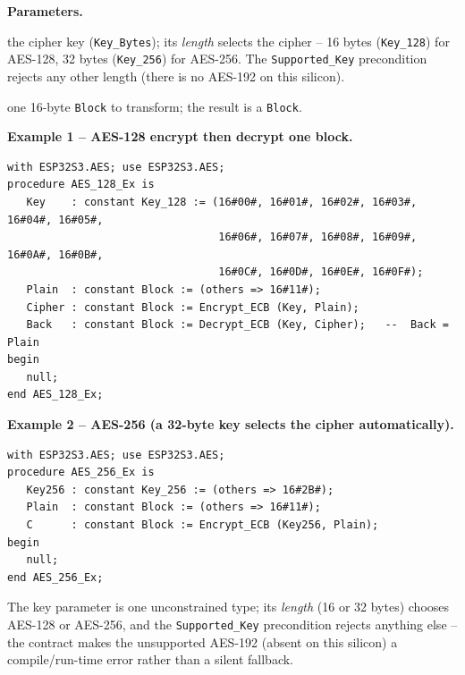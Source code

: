 \textbf{Parameters.}
\begin{description}[style=nextline]
\item[\texttt{Key}] the cipher key (\texttt{Key\_Bytes}); its \emph{length} selects
  the cipher -- 16 bytes (\texttt{Key\_128}) for AES-128, 32 bytes
  (\texttt{Key\_256}) for AES-256. The \texttt{Supported\_Key} precondition rejects
  any other length (there is no AES-192 on this silicon).
\item[\texttt{Plain} / \texttt{Cipher}] one 16-byte \texttt{Block} to transform; the
  result is a \texttt{Block}.
\end{description}

\textbf{Example 1 -- AES-128 encrypt then decrypt one block.}
\begin{lstlisting}
with ESP32S3.AES; use ESP32S3.AES;
procedure AES_128_Ex is
   Key    : constant Key_128 := (16#00#, 16#01#, 16#02#, 16#03#, 16#04#, 16#05#,
                                 16#06#, 16#07#, 16#08#, 16#09#, 16#0A#, 16#0B#,
                                 16#0C#, 16#0D#, 16#0E#, 16#0F#);
   Plain  : constant Block := (others => 16#11#);
   Cipher : constant Block := Encrypt_ECB (Key, Plain);
   Back   : constant Block := Decrypt_ECB (Key, Cipher);   --  Back = Plain
begin
   null;
end AES_128_Ex;
\end{lstlisting}

\textbf{Example 2 -- AES-256 (a 32-byte key selects the cipher automatically).}
\begin{lstlisting}
with ESP32S3.AES; use ESP32S3.AES;
procedure AES_256_Ex is
   Key256 : constant Key_256 := (others => 16#2B#);
   Plain  : constant Block := (others => 16#11#);
   C      : constant Block := Encrypt_ECB (Key256, Plain);
begin
   null;
end AES_256_Ex;
\end{lstlisting}

The key parameter is one unconstrained type; its \emph{length} (16 or 32 bytes)
chooses AES-128 or AES-256, and the \texttt{Supported\_Key} precondition rejects
anything else -- the contract makes the unsupported AES-192 (absent on this
silicon) a compile/run-time error rather than a silent fallback.
